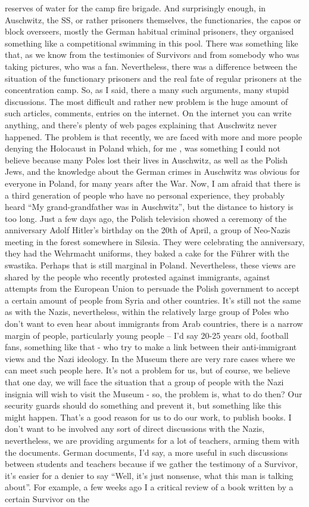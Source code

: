 reserves of water for the camp fire brigade. And surprisingly enough, in Auschwitz, the SS, or rather prisoners themselves, the functionaries, the capos or block overseers, mostly the German habitual criminal prisoners, they organised something like a competitional swimming in this pool. There was something like that, as we know from the testimonies of Survivors and from somebody who was taking pictures, who was a fan. Nevertheless, there was a difference between the situation of the functionary prisoners and the real fate of regular prisoners at the concentration camp. 
So, as I said, there a many such arguments, many stupid discussions. The most difficult and rather new problem is the huge amount of such articles, comments, entries on the internet. On the internet you can write anything, and there’s plenty of web pages explaining that Auschwitz never happened. The problem is that recently, we are faced with more and more people denying the Holocaust in Poland which, for me , was something I could not believe because many Poles lost their lives in Auschwitz, as well as the Polish Jews, and the knowledge about the German crimes in Auschwitz was obvious for everyone in Poland, for many years after the War. Now, I am afraid that there is a third generation of people who have no personal experience, they probably heard ``My grand-grandfather was in Auschwitz'', but the distance to history is too long. Just a few days ago, the Polish television showed a ceremony of the anniversary Adolf Hitler's birthday on the 20th of April, a group of Neo-Nazis meeting in the forest somewhere in Silesia. They were celebrating the anniversary, they had the Wehrmacht uniforms, they baked a cake for the Führer with the swastika. Perhaps that is still marginal in Poland. Nevertheless, these views are shared by the people who recently protested against immigrants, against attempts from the European Union to persuade the Polish government to accept a certain amount of people from Syria and other countries. It's still not the same as with the Nazis, nevertheless, within the relatively large group of Poles who don't want to even hear about immigrants from Arab countries, there is a narrow margin of people, particularly young people – I’d say 20-25 years old, football fans, something like that - who try to make a link between their anti-immigrant views and the Nazi ideology. In the Museum there are very rare cases where we can meet such people here. It's not a problem for us, but of course, we believe that one day, we will face the situation that a group of people with the Nazi insignia will wish to visit the Museum - so, the problem is, what to do then? Our security guards should do something and prevent it, but something like this might happen. That's a good reason for us to do our work, to publish books. I don’t want to be involved any sort of direct discussions with the Nazis, nevertheless, we are providing arguments for a lot of teachers, arming them with the documents. German documents, I'd say, a more useful in such discussions between students and teachers because if we gather the testimony of a Survivor, it’s easier for a denier to say ``Well, it’s just nonsense, what this man is talking about''. For example, a few weeks ago I a critical review of a book written by a certain Survivor on the 